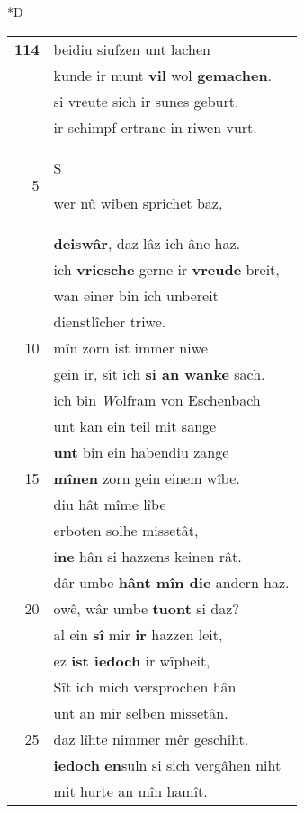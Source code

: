 \documentclass[8pt,a4paper,notitlepage]{article}
\begin{document}
\begin{table}[ht]
\begin{minipage}[t]{0.5\linewidth}
\small
\begin{center}*D
\end{center}
\begin{tabular}{rl}
\textbf{114} & beidiu siufzen unt lachen\\ 
 & kunde ir munt \textbf{vil} wol \textbf{gemachen}.\\ 
 & si vreute sich ir sunes geburt.\\ 
 & ir schimpf ertranc in riwen vurt.\\ 
5 & \begin{large}S\end{large}wer nû wîben sprichet baz,\\ 
 & \textbf{deiswâr}, daz lâz ich âne haz.\\ 
 & ich \textbf{vriesche} gerne ir \textbf{vreude} breit,\\ 
 & wan einer bin ich unbereit\\ 
 & dienstlîcher triwe.\\ 
10 & mîn zorn ist immer niwe\\ 
 & gein ir, sît ich \textbf{si an wanke} sach.\\ 
 & ich bin \textit{W}olfram von Eschenbach\\ 
 & unt kan ein teil mit sange\\ 
 & \textbf{unt} bin ein habendiu zange\\ 
15 & \textbf{mînen} zorn gein einem wîbe.\\ 
 & diu hât mîme lîbe\\ 
 & erboten solhe missetât,\\ 
 & i\textbf{ne} hân si hazzens keinen rât.\\ 
 & dâr umbe \textbf{hânt mîn die} andern haz.\\ 
20 & owê, wâr umbe \textbf{tuont} si daz?\\ 
 & al ein \textbf{sî} mir \textbf{ir} hazzen leit,\\ 
 & ez \textbf{ist iedoch} ir wîpheit,\\ 
 & Sît ich mich versprochen hân\\ 
 & unt an mir selben missetân.\\ 
25 & daz lîhte nimmer mêr geschiht.\\ 
 & \textbf{iedoch} \textbf{en}suln si sich vergâhen niht\\ 
 & mit hurte an mîn hamît.\\ 

\end{tabular}
\end{minipage}
\end{table}
\end{document}
